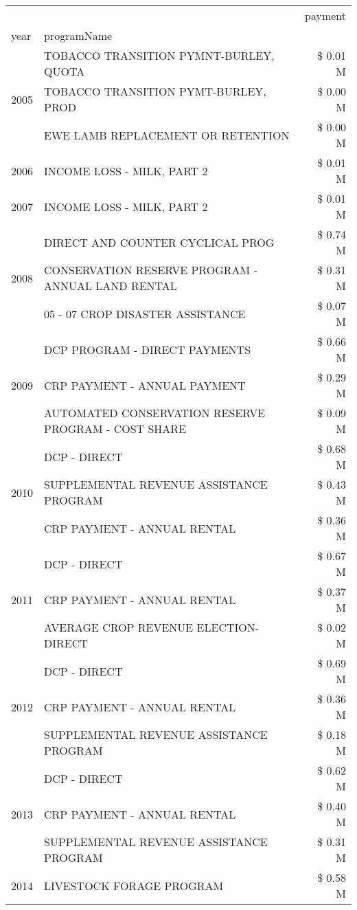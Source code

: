 \begin{tabular}{llr}
\toprule
 &  & payment \\
year & programName &  \\
\midrule
\multirow[t]{3}{*}{2005} & TOBACCO TRANSITION PYMNT-BURLEY, QUOTA & \$ 0.01 M \\
 & TOBACCO TRANSITION PYMT-BURLEY, PROD & \$ 0.00 M \\
 & EWE LAMB REPLACEMENT OR RETENTION & \$ 0.00 M \\
\cline{1-3}
2006 & INCOME LOSS - MILK, PART 2 & \$ 0.01 M \\
\cline{1-3}
2007 & INCOME LOSS - MILK, PART 2 & \$ 0.01 M \\
\cline{1-3}
\multirow[t]{3}{*}{2008} & DIRECT AND COUNTER CYCLICAL PROG & \$ 0.74 M \\
 & CONSERVATION RESERVE PROGRAM - ANNUAL LAND RENTAL & \$ 0.31 M \\
 & 05 - 07 CROP DISASTER ASSISTANCE & \$ 0.07 M \\
\cline{1-3}
\multirow[t]{3}{*}{2009} & DCP PROGRAM - DIRECT PAYMENTS & \$ 0.66 M \\
 & CRP PAYMENT - ANNUAL PAYMENT & \$ 0.29 M \\
 & AUTOMATED CONSERVATION RESERVE PROGRAM - COST SHARE & \$ 0.09 M \\
\cline{1-3}
\multirow[t]{3}{*}{2010} & DCP - DIRECT & \$ 0.68 M \\
 & SUPPLEMENTAL REVENUE ASSISTANCE PROGRAM & \$ 0.43 M \\
 & CRP PAYMENT - ANNUAL RENTAL & \$ 0.36 M \\
\cline{1-3}
\multirow[t]{3}{*}{2011} & DCP - DIRECT & \$ 0.67 M \\
 & CRP PAYMENT - ANNUAL RENTAL & \$ 0.37 M \\
 & AVERAGE CROP REVENUE ELECTION-DIRECT & \$ 0.02 M \\
\cline{1-3}
\multirow[t]{3}{*}{2012} & DCP - DIRECT & \$ 0.69 M \\
 & CRP PAYMENT - ANNUAL RENTAL & \$ 0.36 M \\
 & SUPPLEMENTAL REVENUE ASSISTANCE PROGRAM & \$ 0.18 M \\
\cline{1-3}
\multirow[t]{3}{*}{2013} & DCP - DIRECT & \$ 0.62 M \\
 & CRP PAYMENT - ANNUAL RENTAL & \$ 0.40 M \\
 & SUPPLEMENTAL REVENUE ASSISTANCE PROGRAM & \$ 0.31 M \\
\cline{1-3}
\multirow[t]{3}{*}{2014} & LIVESTOCK FORAGE PROGRAM & \$ 0.58 M \\

\end{tabular}
